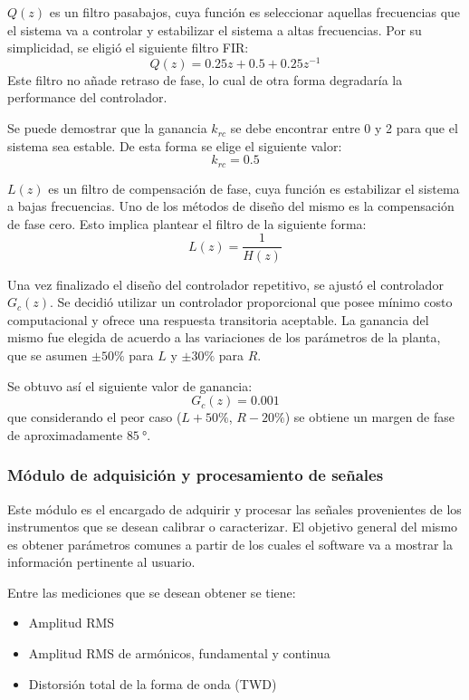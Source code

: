\documentclass[titlepage, 12pt]{article}
\begin{document}
$Q(z)$ es un filtro pasabajos, cuya función es seleccionar aquellas frecuencias que el sistema va a controlar y estabilizar el sistema a altas frecuencias. Por su simplicidad, se eligió el siguiente filtro FIR:
\[
    Q(z) = 0.25 z + 0.5 + 0.25 z^{-1}
\]
Este filtro no añade retraso de fase, lo cual de otra forma degradaría la performance del controlador.

Se puede demostrar que la ganancia $k_{rc}$ se debe encontrar entre 0 y 2 para que el sistema sea estable. De esta forma se elige el siguiente valor:
\[
    k_{rc} = 0.5
\]

$L(z)$ es un filtro de compensación de fase, cuya función es estabilizar el sistema a bajas frecuencias. Uno de los métodos de diseño del mismo es la compensación de fase cero. Esto implica plantear el filtro de la siguiente forma:
\[
    L(z) = \frac{1}{H(z)}
\]

Una vez finalizado el diseño del controlador repetitivo, se ajustó el controlador $G_c(z)$. Se decidió utilizar un controlador proporcional que posee mínimo costo computacional y ofrece una respuesta transitoria aceptable. La ganancia del mismo fue elegida de acuerdo a las variaciones de los parámetros de la planta, que se asumen $\pm 50\%$ para $L$ y $\pm 30\%$ para $R$.

Se obtuvo así el siguiente valor de ganancia:
\[
    G_c(z) = 0.001
\]
que considerando el peor caso ($L + 50\%$, $R - 20\%$) se obtiene un margen de fase de aproximadamente $\SI{85}{\degree}$.

\subsubsection{Módulo de adquisición y procesamiento de señales}
Este módulo es el encargado de adquirir y procesar las señales provenientes de los instrumentos que se desean calibrar o caracterizar. El objetivo general del mismo es obtener parámetros comunes a partir de los cuales el software va a mostrar la información pertinente al usuario.

Entre las mediciones que se desean obtener se tiene:
    \begin{itemize}
        \item Amplitud RMS
        \item Amplitud RMS de armónicos, fundamental y continua
        \item Distorsión total de la forma de onda (TWD)
    \end{itemize}
\end{document}
